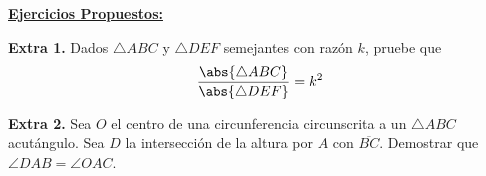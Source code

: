 \documentclass{article}
\begin{document}
\vspace{1cm}
\noindent\textbf{\underline{Ejercicios Propuestos:}}

\vspace{5mm}
\noindent\textbf{Extra 1.} Dados $\triangle ABC$ y $\triangle DEF$ semejantes con razón $k$, 
pruebe que
\begin{equation*}
    \frac{\abs{\triangle ABC}}{\abs{\triangle DEF}}=k^{2}
\end{equation*}

\vspace{5mm}
\noindent\textbf{Extra 2.} Sea $O$ el centro de una circunferencia circunscrita a un 
$\triangle ABC$ acutángulo. Sea $D$ la intersección de la altura por $A$ con $\overline{BC}$. 
Demostrar que $\angle DAB=\angle OAC$.

\end{document}
